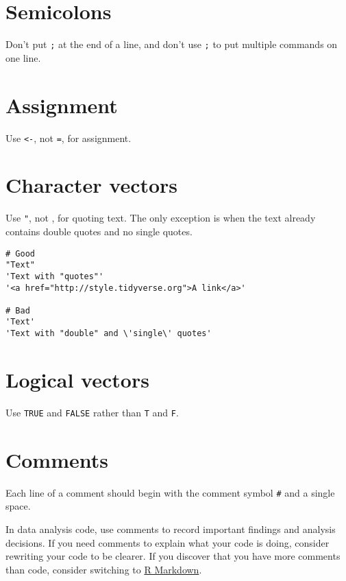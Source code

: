 \documentclass[
]{book}
\begin{document}
\hypertarget{semicolons}{%
\section{Semicolons}\label{semicolons}}

Don't put \texttt{;} at the end of a line, and don't use \texttt{;} to put multiple commands
on one line.

\hypertarget{assignment-1}{%
\section{Assignment}\label{assignment-1}}

Use \texttt{\textless{}-}, not \texttt{=}, for assignment.

\hypertarget{character-vectors}{%
\section{Character vectors}\label{character-vectors}}

Use \texttt{"}, not \texttt{\textquotesingle{}}, for quoting text. The only exception is when the text already
contains double quotes and no single quotes.

\begin{verbatim}
# Good
"Text"
'Text with "quotes"'
'<a href="http://style.tidyverse.org">A link</a>'

# Bad
'Text'
'Text with "double" and \'single\' quotes'
\end{verbatim}

\hypertarget{logical-vectors}{%
\section{Logical vectors}\label{logical-vectors}}

Use \texttt{TRUE} and \texttt{FALSE} rather than \texttt{T} and \texttt{F}.

\hypertarget{comments-2}{%
\section{Comments}\label{comments-2}}

Each line of a comment should begin with the comment symbol \texttt{\#} and a single space.

In data analysis code, use comments to record important findings and analysis
decisions. If you need comments to explain what your code is doing, consider
rewriting your code to be clearer. If you discover that you have more comments
than code, consider switching to \href{https://rmarkdown.rstudio.com/}{R Markdown}.
\end{document}
